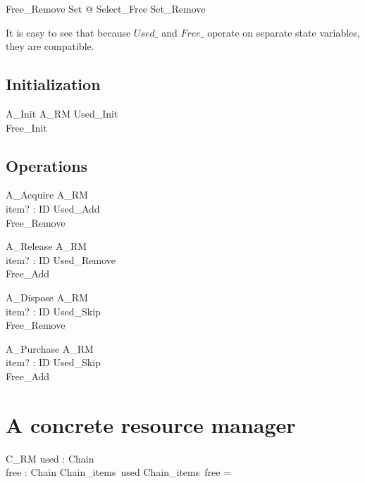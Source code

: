\documentclass{article}
\begin{document}
\begin{zed}
	Free\_Remove  \exists \Delta Set @ Select\_Free \land Set\_Remove
\end{zed}

It is easy to see that because $Used\_$ and $Free\_$ operate on separate state variables, they are compatible.

\subsection{Initialization}

\begin{schema}{A\_Init}
	\Delta A\_RM 
\where
	Used\_Init \\
	Free\_Init
\end{schema}

\subsection{Operations}

\begin{schema}{A\_Acquire}
	\Delta A\_RM \\
	item? : ID 
\where
	Used\_Add \\
	Free\_Remove
\end{schema}

\begin{schema}{A\_Release}
	\Delta A\_RM \\
	item? : ID 
\where
	Used\_Remove \\
	Free\_Add
\end{schema}

\begin{schema}{A\_Dispose}
	\Delta A\_RM \\
	item? : ID
\where
	Used\_Skip \\
	Free\_Remove
\end{schema}

\begin{schema}{A\_Purchase}
	\Delta A\_RM \\
	item? : ID
\where
	Used\_Skip \\
	Free\_Add
\end{schema}

\section{A concrete resource manager}

\begin{schema}{C\_RM}
	used : Chain \\
	free : Chain 
\where
	Chain\_items~used \cap Chain\_items~free = \emptyset
\end{schema}
\end{document}
